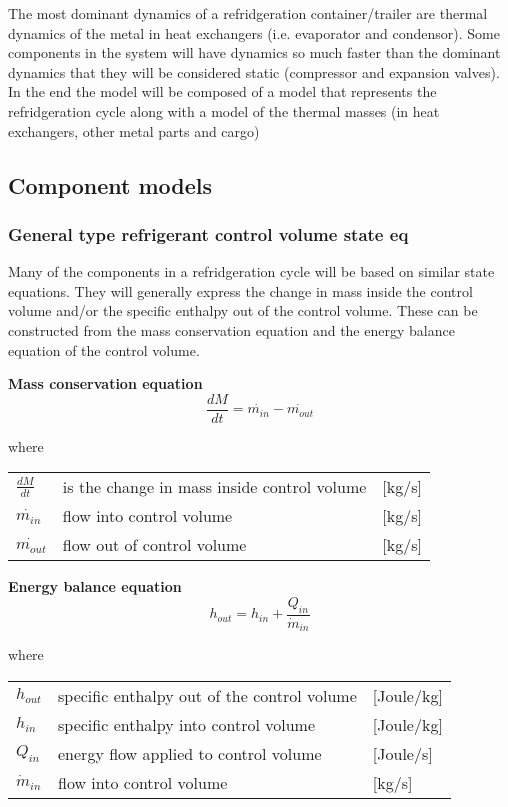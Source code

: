 The most dominant dynamics of a refridgeration container/trailer are thermal dynamics of the metal in heat exchangers (i.e. evaporator and condensor). Some components in the system will have dynamics so much faster than the dominant dynamics that they will be considered static (compressor and expansion valves).
In the end the model will be composed of a model that represents the refridgeration cycle along with a model of the thermal masses (in heat exchangers, other metal parts and cargo)


\subsection{Component models}

\subsubsection{General type refrigerant control volume state eq}
Many of the components in a refridgeration cycle will be based on similar state equations. They will generally express the change in mass inside the control volume and/or the specific enthalpy out of the control volume. These can be constructed from the mass conservation equation and the energy balance equation of the control volume.

\textbf{Mass conservation equation} \\
\begin{equation} \label{eq:GeneralTypeControlVol_MassConservation}
	\frac{dM}{dt} = \dot{m_{in}} - \dot{m_{out}}
\end{equation}

where 
\begin{center}
	\begin{tabular}{l p{8cm} l}
		$\frac{dM}{dt}$ & is the change in mass inside control volume & [\si{kg}/\si{s}]\\ 
		$\dot{m_{in}}$ & flow into control volume & [\si{kg}/\si{s}]\\
		$\dot{m_{out}}$ & flow out of control volume & [\si{kg}/\si{s}]\\
	\end{tabular}
\end{center}

\textbf{Energy balance equation}
\begin{equation}
	h_{out} = h_{in} + \frac{Q_{in}}{\dot{m}_{in}}
\end{equation}

where
\begin{center}
	\begin{tabular}{l p{8cm} l}
		$h_{out}$ & specific enthalpy out of the control volume & [\si{Joule}/\si{kg}]\\ 
		$h_{in}$ & specific enthalpy into control volume & [\si{Joule}/\si{kg}]\\ 
		$Q_{in}$ & energy flow applied to control volume& [\si{Joule}/\si{s}]\\
		$\dot{m}_{in}$ & flow into control volume & [\si{kg}/\si{s}]\\
	\end{tabular}
\end{center}

